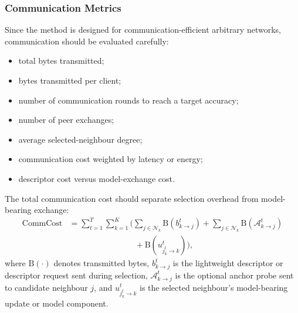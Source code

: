 \documentclass[conference]{IEEEtran}
\newcommand{\rev}[1]{{\color{red}#1}}
\begin{document}
\subsubsection{Communication Metrics}
\label{subsubsec:communication-metrics}
Since the method is designed for communication-efficient arbitrary networks, communication should be evaluated carefully:
\begin{itemize}
    \item total bytes transmitted;
    \item bytes transmitted per client;
    \item number of communication rounds to reach a target accuracy;
    \item number of peer exchanges;
    \item average selected-neighbour degree;
    \item communication cost weighted by latency or energy;
    \item descriptor cost versus model-exchange cost.
\end{itemize}

\rev{The total communication cost should separate selection overhead from model-bearing exchange:}
\begin{equation}
\begin{aligned}
    \text{CommCost}
    &=
    \sum_{t=1}^{T}
    \sum_{k=1}^{K}
    \Bigg(
    \sum_{j\in\mathcal{N}_k}
    \mathrm{B}(b_{k\to j}^t)
    +
    \sum_{j\in\mathcal{N}_k}
    \mathrm{B}(\mathcal{A}_{k\to j}^t)\\
    &\qquad\qquad\qquad\qquad
    +
    \mathrm{B}(u_{j_k^t\to k}^t)
    \Bigg),
    \label{eq:auto-100}
\end{aligned}
\end{equation}
\rev{where \(\mathrm{B}(\cdot)\) denotes transmitted bytes, \(b_{k\to j}^t\) is the lightweight descriptor or descriptor request sent during selection, \(\mathcal{A}_{k\to j}^t\) is the optional anchor probe sent to candidate neighbour \(j\), and \(u_{j_k^t\to k}^t\) is the selected neighbour's model-bearing update or model component.}
\end{document}
